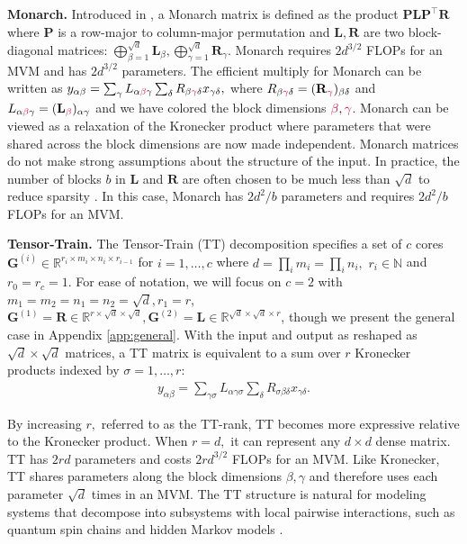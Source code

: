 \documentclass{article}
\newcommand{\mbf}[1]{{\boldsymbol{\mathbf{#1}}}}
\newcommand{\bm}{\mbf}
\theoremstyle{plain}
\theoremstyle{definition}
\theoremstyle{remark}
\newcommand{\tc}[1]{\textcolor{purple}{#1}}
\newcommand{\R}{\mathbb{R}}
\begin{document}
\noindent \textbf{Monarch.} \quad
Introduced in \citet{dao2022monarch}, a Monarch matrix
is defined as the product $\bm{P} \bm{L} \bm{P}^{\top} \bm{R}$ where $\bm{P}$ is a row-major to column-major permutation
and $\bm{L}, \bm{R}$ are two block-diagonal matrices: $\bigoplus_{\beta=1}^{\sqrt{d}} \bm{L}_\beta, \bigoplus_{\gamma=1}^{\sqrt{d}} \bm{R}_\gamma$. Monarch requires $2d^{3/2}$ FLOPs for an MVM and has $2d^{3/2}$ parameters. The efficient multiply for Monarch can be written as $y_{\alpha\beta} = \sum_{\gamma} L_{\alpha\tc{\beta}\gamma} \sum_{\delta} R_{\beta\tc{\gamma}\delta} x_{\gamma\delta},$ where $R_{\beta\tc{\gamma}\delta} = (\bm{R}_{\tc{\gamma}})_{\beta\delta}$ and $L_{\alpha\tc{\beta}\gamma} = (\bm{L}_{\tc{\beta}})_{\alpha\gamma}$ and we have colored the block dimensions $\tc{\beta}, \tc{\gamma}$. Monarch can be viewed as a relaxation of the Kronecker product where parameters that were shared across the block dimensions are now made independent. Monarch matrices do not make strong assumptions about the structure of the input. In practice, the number of blocks $b$ in $\bm{L}$ and $\bm{R}$ are often chosen to be much less than $\sqrt{d}$ to reduce sparsity \citep{dao2022monarch, fu2023mixer}. In this case, Monarch has $2d^2/b$ parameters and requires $2d^2/b$ FLOPs for an MVM.

\noindent \textbf{Tensor-Train.} \quad
The Tensor-Train (TT) decomposition \citep{oseledets2011tt} specifies a set of $c$ cores $\bm{G}^{(i)} \in \mathbb{R}^{r_{i} \times  m_{i} \times  n_{i} \times  r_{i-1}}$
for $i=1, \ldots, c$ where $d = \prod_{i}^{} m_{i} = \prod_{i}^{} n_{i},$
$r_{i} \in \mathbb{N}$ and $r_{0} = r_{c} = 1$.
For ease of notation, we will focus on $c=2$ with $m_1=m_2=n_1=n_2=\sqrt{d}, r_{1} = r$, $\bm{G}^{(1)} = \bm{R} \in \R^{r \times \sqrt{d} \times \sqrt{d}}, \bm{G}^{(2)} = \bm{L} \in \R^{\sqrt{d} \times \sqrt{d} \times r}$,  though we present the general case in Appendix \ref{app:general}.
With the input and output as reshaped as $\sqrt{d} \times \sqrt{d}$ matrices, a TT matrix is equivalent to a sum over $r$ Kronecker products indexed by $\sigma=1,\ldots, r$:
\begin{equation} \label{eq:full}
    \begin{split}
      y_{\alpha\beta} = \sum_{\gamma\sigma} L_{\alpha\gamma\sigma} \sum_{\delta} R_{\sigma\beta\delta} x_{\gamma\delta}.
    \end{split}
\end{equation}

By increasing $r,$ referred to as the TT-rank, TT becomes more expressive relative to the Kronecker product. When $r=d,$ it can represent any $d \times d$ dense matrix. TT has $2rd$ parameters and costs $2rd^{3/2}$ FLOPs for an MVM. Like Kronecker, TT shares parameters along the block dimensions $\beta,\gamma$ and therefore uses each parameter $\sqrt{d}$ times in an MVM. The TT structure is natural for modeling systems that decompose into subsystems with local pairwise interactions, such as quantum spin chains and hidden Markov models \citep{fannes1992finitely, critch2014algebraic}.
\end{document}
